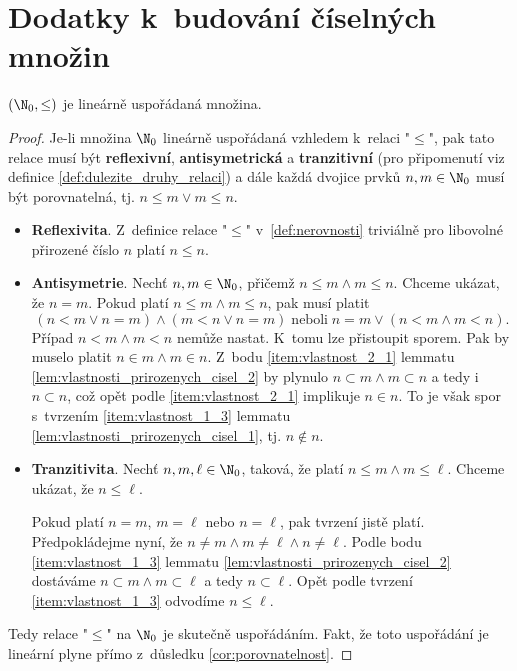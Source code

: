 \chapter{Dodatky k~budování číselných množin}\label{chap:dodatky_k_budovani_cis_mn}
\begin{theorem}
    $(\N_0,\leq)$ je lineárně uspořádaná množina.
\end{theorem}
\begin{proof}
    Je-li množina $\N_0$ lineárně uspořádaná vzhledem k~relaci "$\leq$", pak tato relace musí být \textbf{reflexivní}, \textbf{antisymetrická} a \textbf{tranzitivní} (pro připomenutí viz definice \ref{def:dulezite_druhy_relaci}) a dále každá dvojice prvků $n,m\in\N_0$ musí být porovnatelná, tj. $n\leq m\lor m\leq n$.
    \begin{itemize}
        \item \textbf{Reflexivita}. Z~definice relace "$\leq$" v~\ref{def:nerovnosti} triviálně pro libovolné přirozené číslo $n$ platí $n\leq n$.
        \item \textbf{Antisymetrie}. Nechť $n,m\in\N_0$, přičemž $n\leq m \land m\leq n$. Chceme ukázat, že $n=m$. Pokud platí $n\leq m \land m\leq n$, pak musí platit
        \begin{equation*}
            (n<m\lor n=m) \land (m<n\lor n=m)\;\text{neboli}\;n=m\lor (n<m\land m<n).
        \end{equation*}
        Případ $n<m\land m<n$ nemůže nastat. K~tomu lze přistoupit sporem. Pak by muselo platit $n\in m\land m\in n$. Z~bodu \ref{item:vlastnost_2_1} lemmatu \ref{lem:vlastnosti_prirozenych_cisel_2} by plynulo $n\subset m\land m\subset n$ a tedy i $n\subset n$, což opět podle \ref{item:vlastnost_2_1} implikuje $n\in n$. To je však spor s~tvrzením \ref{item:vlastnost_1_3} lemmatu \ref{lem:vlastnosti_prirozenych_cisel_1}, tj. $n\notin n$.
        \item \textbf{Tranzitivita}. Nechť $n,m,\ell\in\N_0$, taková, že platí $n\leq m \land m\leq\ell$. Chceme ukázat, že $n\leq\ell$.\par
        Pokud platí $n=m$, $m=\ell$ nebo $n=\ell$, pak tvrzení jistě platí. Předpokládejme nyní, že $n\neq m\land m\neq\ell\land n\neq\ell$. Podle bodu \ref{item:vlastnost_1_3} lemmatu \ref{lem:vlastnosti_prirozenych_cisel_2} dostáváme $n\subset m\land m\subset\ell$ a tedy $n\subset\ell$. Opět podle tvrzení \ref{item:vlastnost_1_3} odvodíme $n\leq\ell$.
    \end{itemize}
    Tedy relace "$\leq$" na $\N_0$ je skutečně uspořádáním. Fakt, že toto uspořádání je lineární plyne přímo z~důsledku \ref{cor:porovnatelnost}.
\end{proof}